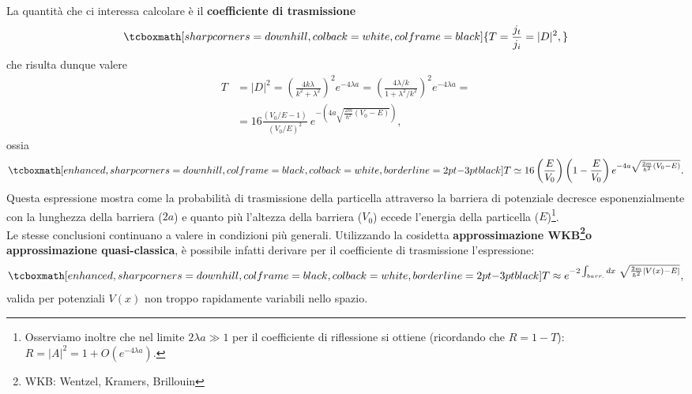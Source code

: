 \documentclass[a4paper,12pt,oneside]{book}
\begin{document}
La quantità che ci interessa calcolare è il \textbf{coefficiente di trasmissione}
	\begin{equation}
		\tcboxmath[sharp corners=downhill, colback=white, colframe=black]{
			T=\frac{j_t}{j_i}=|D|^2,
			}
	\end{equation}
che risulta dunque valere
	\begin{align}
		T &= |D|^2= \left(\frac{4k\lambda}{k^2+\lambda ^2} \right) ^2 e^{-4\lambda a} =\left(\frac{4\lambda /k}{1+\lambda ^2/k^2} \right) ^2 e^{-4\lambda a}= \nonumber \\[0.3cm]
		&=16\frac{\left(V_0 /E-1\right)}{\left(V_0 /E \right) ^2}\ e^{-\left(4a\sqrt{\frac{2m}{\hbar ^2}\left(V_0-E\right)}\right)},
	\end{align}
ossia
	\begin{equation}
		\tcboxmath[enhanced, sharp corners=downhill, colframe=black, colback=white, borderline={2pt}{-3pt}{black}]{
			T \simeq 16 \left(\frac{E}{V_0} \right) \left(1-\frac{E}{V_0}\right) e^{-4a\sqrt{\frac{2m}{\hbar ^2}\left(V_0-E\right)}}.
			}
	\end{equation}
Questa espressione mostra come la probabilità di trasmissione della particella attraverso la barriera di potenziale decresce esponenzialmente con la lunghezza della barriera ($2a$) e quanto più l'altezza della barriera ($V_0$) eccede l'energia della particella ($E$)\footnote{Osserviamo inoltre che nel limite $2\lambda a \gg 1 $ per il coefficiente di riflessione si ottiene (ricordando che $R=1-T$): $
 R=|A|^2=1+O(e^{-4\lambda a})$.}.\\

Le stesse conclusioni continuano a valere in condizioni più generali. Utilizzando la cosidetta \textbf{approssimazione WKB\footnote{WKB: Wentzel, Kramers, Brillouin}o approssimazione quasi-classica}, è possibile infatti derivare per il coefficiente di trasmissione l'espressione:
	\begin{equation}
		\tcboxmath[enhanced, sharp corners=downhill, colframe=black, colback=white, borderline={2pt}{-3pt}{black}]{
			T \approx e^{-2 \int_{barr.} dx\ \sqrt{\frac{2m}{\hbar ^2}\left[ V(x)-E \right]}},
			}
		 \end{equation}
valida per potenziali $V(x)$ non troppo rapidamente variabili nello spazio.\\
\end{document}
